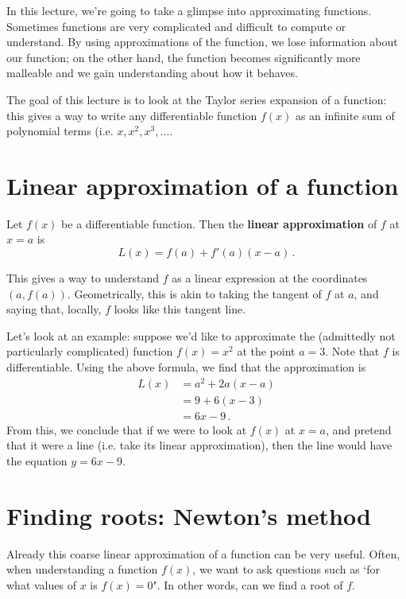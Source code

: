 \documentclass[12pt]{article}
\begin{document}
In this lecture, we're going to take a glimpse into approximating functions. Sometimes functions are very complicated and difficult to compute or understand. By using approximations of the function, we lose information about our function; on the other hand, the function becomes significantly more malleable and we gain understanding about how it behaves. 

The goal of this lecture is to look at the Taylor series expansion of a function: this gives a way to write any differentiable function $f(x)$ as an infinite sum of polynomial terms (i.e. $x, x^2, x^3,\dots$. 

\section*{Linear approximation of a function}
Let $f(x)$ be a differentiable function. Then the \textbf{linear approximation} of $f$ at $x = a$ is 
\begin{equation}
    L(x) = f(a) + f'(a) (x-a)\,.
\end{equation}

This gives a way to understand $f$ as a linear expression at the coordinates $(a, f(a))$. Geometrically, this is akin to taking the tangent of $f$ at $a$, and saying that, locally, $f$ looks like this tangent line. 

Let's look at an example: suppose we'd like to approximate the (admittedly not particularly complicated) function $f(x) = x^2$ at the point $a=3$. Note that $f$ is differentiable. Using the above formula, we find that the approximation is 
\begin{align*}
    L(x) &= a^2 + 2a(x-a)\\
    & = 9 + 6(x-3)\\
    & = 6x - 9\,.
\end{align*}
From this, we conclude that if we were to look at $f(x)$ at $x=a$, and pretend that it were a line (i.e. take its linear approximation), then the line would have the equation $y = 6x-9$.

\section*{Finding roots: Newton's method}
Already this coarse linear approximation of a function can be very useful. Often, when understanding a function $f(x)$, we want to ask questions such as `for what values of $x$ is $f(x) =0$". In other words, can we find a root of $f$. 
\end{document}
